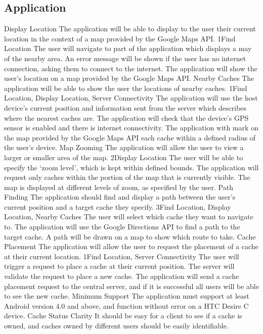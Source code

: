 	\subsection{Application}
		\funcreq
			{Display Location}
			{The application will be able to display to the user their current location in the context of a map provided by the Google Maps API.}
			{1}{Find Location}
			{The user will navigate to part of the application which displays a may of the nearby area.}
			{An error message will be shown if the user has no internet connection, asking them to connect to the internet.}
			{The application will show the user's location on a map provided by the Google Maps API.}
		\funcreq
			{Nearby Caches}
			{The application will be able to show the user the locations of nearby caches.}
			{1}{Find Location, Display Location, Server Connectivity}
			{The application will use the host device's current position and information sent from the server which describes where the nearest caches are.}
			{The application will check that the device's GPS sensor is enabled and there is internet connectivity.}
			{The application with mark on the map provided by the Google Maps API each cache within a defined radius of the user's device.}
		\funcreq
			{Map Zooming}
			{The application will allow the user to view a larger or smaller area of the map.}
			{2}{Display Location}
			{The user will be able to specify the `zoom level', which is kept within defined bounds.}
			{The application will request only caches within the portion of the map that is currently visible.}
			{The map is displayed at different levels of zoom, as specified by the user.}
		\funcreq
			{Path Finding}
			{The application should find and display a path between the user's current position and a target cache they specify.}
			{3}{Find Location, Display Location, Nearby Caches}
			{The user will select which cache they want to navigate to.}
			{The application will use the Google Directions API to find a path to the target cache.}
			{A path will be drawn on a map to show which route to take.}
		\funcreq
			{Cache Placement}
			{The application will allow the user to request the placement of a cache at their current location.}
			{1}{Find Location, Server Connectivity}
			{The user will trigger a request to place a cache at their current position.}
			{The server will validate the request to place a new cache.}
			{The application will send a cache placement request to the central server, and if it is successful all users will be able to see the new cache.}
		\nonfuncreq
			{Minimum Support}
			{The application must support at least Android version 4.0 and above, and function without error on a HTC Desire C device.}
		\nonfuncreq
			{Cache Status Clarity}
			{It should be easy for a client to see if a cache is owned, and caches owned by different users should be easily identifiable.}

\renewcommand{\arraystretch}{1}
